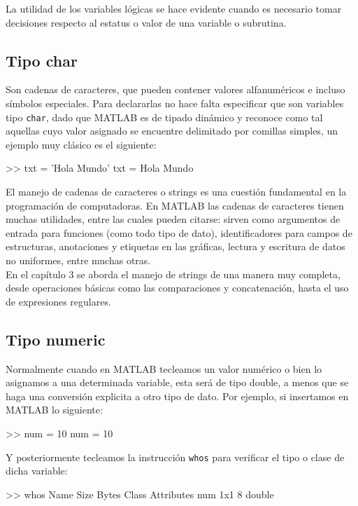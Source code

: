 La utilidad de los variables lógicas se hace evidente cuando es necesario 
tomar decisiones respecto al estatus o valor de una variable o subrutina.

\subsection{Tipo char}

Son cadenas de caracteres, que pueden contener valores alfanuméricos e
incluso símbolos especiales. Para declararlas no hace falta especificar
que son variables tipo \texttt{char}, dado que MATLAB es de tipado dinámico y
reconoce como tal aquellas cuyo valor asignado se encuentre delimitado
por comillas simples, un ejemplo muy clásico es el siguiente:

\begin{matlab}
>> txt = 'Hola Mundo'
txt =
Hola Mundo
\end{matlab}

El manejo de cadenas de caracteres o strings es una cuestión fundamental 
en la programación de computadoras. En MATLAB las cadenas de caracteres 
tienen muchas utilidades, entre las cuales pueden citarse: sirven como 
argumentos de entrada para funciones (como todo tipo de dato), identificadores 
para campos de estructuras, anotaciones y etiquetas en las gráficas, 
lectura y escritura de datos no uniformes, entre muchas otras. \\

En el capítulo 3 se aborda el manejo de strings de una manera muy completa, 
desde operaciones básicas como las comparaciones y concatenación, hasta el 
uso de expresiones regulares.

\subsection{Tipo numeric}

Normalmente cuando en MATLAB tecleamos un valor numérico o bien lo
asignamos a una determinada variable, esta será de tipo double, a menos
que se haga una conversión explicita a otro tipo de dato. Por ejemplo,
si insertamos en MATLAB lo siguiente:

\begin{matlab}
>> num = 10
num =
    10
\end{matlab}

Y posteriormente tecleamos la instrucción \texttt{whos} para verificar 
el tipo o clase de dicha variable:

\begin{matlab}
>> whos
  Name      Size            Bytes  Class     Attributes
  num       1x1                 8  double   
\end{matlab}

